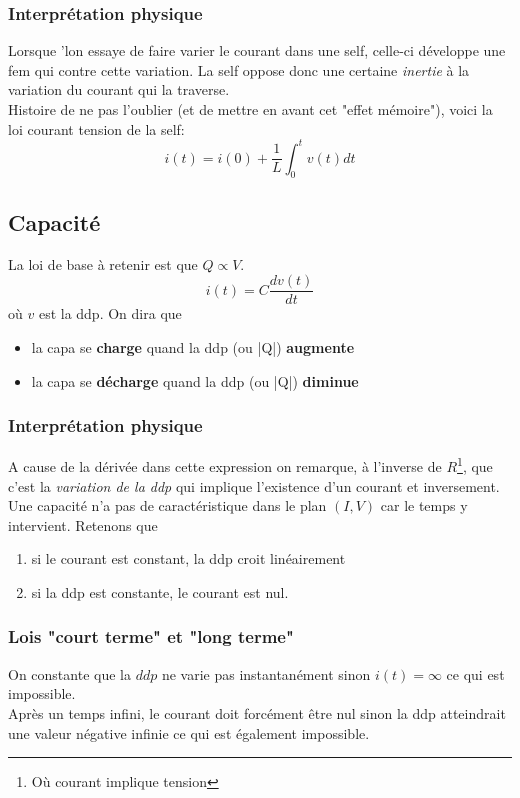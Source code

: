 \documentclass	[11pt, a4paper, openany]{book}
\begin{document}
\subsubsection{Interprétation physique}
Lorsque 'lon essaye de faire varier le courant dans une self, celle-ci développe une fem qui contre cette variation. La self oppose donc une certaine \textit{inertie} à la variation du courant qui la traverse.\\

Histoire de ne pas l'oublier (et de mettre en avant cet "effet mémoire"), voici la loi courant tension de la self:
\begin{equation}
i(t) = i(0) + \frac{1}{L}\int_0^t v(t) dt
\end{equation}


\subsection{Capacité}
La loi de base à retenir est que $Q \propto V$.
\begin{equation}
i(t) = C \frac{dv(t)}{dt}
\end{equation}
où $v$ est la ddp. On dira que
\begin{itemize}
\item la capa se \textbf{charge} quand la ddp (ou |Q|) \textbf{augmente}
\item la capa se \textbf{décharge} quand la ddp (ou |Q|) \textbf{diminue}
\end{itemize}


\subsubsection{Interprétation physique}
A cause de la dérivée dans cette expression on remarque, à l'inverse de $R$\footnote{Où courant implique tension}, que c'est la \textit{variation de la ddp} qui implique l'existence d'un courant et inversement.\\
Une capacité n'a pas de caractéristique dans le plan $(I,V)$ car le temps y intervient. Retenons que
\begin{enumerate}
\item si le courant est constant, la ddp croit linéairement
\item si la ddp est constante, le courant est nul.
\end{enumerate}

\subsubsection{Lois "court terme" et "long terme"}
On constante que la $ddp$ ne varie pas instantanément sinon $i(t) = \infty$ ce qui est impossible.\\
Après un temps infini, le courant doit forcément être nul sinon la ddp atteindrait une valeur négative infinie ce qui est également impossible.
\end{document}
